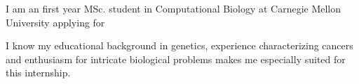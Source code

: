 \documentclass[11pt, a4paper]{./Awesome-CV/awesome-cv}
\begin{document}
\vspace*{\fill}
\makelettertitle %

\begin{cvletter}
\hspace{8mm} I am an first year MSc. student in Computational Biology at Carnegie Mellon University applying for
\par \hspace{8mm}
I know my educational background in genetics, experience characterizing cancers and enthusiasm for intricate biological problems makes me especially suited for this internship.

\end{cvletter}
\makeletterclosing
\vspace*{\fill}
\end{document}
